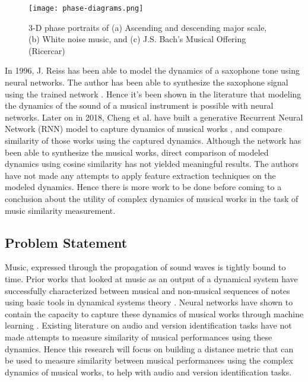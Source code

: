 \documentclass[../main.tex]{subfiles}
\begin{document}
\begin{figure}[h]
    \centering
    \texttt{[image: phase-diagrams.png]}
    \caption{3-D phase portraits of (a) Ascending and descending major scale, (b) White noise music, and (c) J.S. Bach's Musical Offering (Ricercar)}
    \label{fig:phase-diagrams}
\end{figure}

\par
In 1996, J. Reiss has been able to model the dynamics of a saxophone tone using neural networks. The author has been able to synthesize the saxophone signal using the trained network \cite{robelNeuralNetworkModeling1997}. Hence it's been shown in the literature that modeling the dynamics of the sound of a musical instrument is possible with neural networks. Later on in 2018, Cheng et al. have built a generative Recurrent Neural Network (\gls{RNN}) model to capture dynamics of musical works  \cite{tian_cheng_comparing_2018}, and compare similarity of those works using the captured dynamics. Although the network has been able to synthesize the musical works, direct comparison of modeled dynamics using cosine similarity has not yielded meaningful results. The authors have not made any attempts to apply feature extraction techniques on the modeled dynamics. Hence there is more work to be done before coming to a conclusion about the utility of complex dynamics of musical works in the task of music similarity measurement.


\subsection{Problem Statement}

\par
Music, expressed through the propagation of sound waves is tightly bound to time. Prior works that looked at music as an output of a dynamical system have successfully characterized between musical and non-musical sequences of notes using basic tools in dynamical systems theory \cite{complex_dynamics}. Neural networks have shown to contain the capacity to capture these dynamics of musical works through machine learning \cite{robelNeuralNetworkModeling1997,dynamic_process_modeling_with_rnn}. Existing literature on audio and version identification tasks have not made attempts to measure similarity of musical performances using these dynamics. Hence this research will focus on building a distance metric that can be used to measure similarity between musical performances using the complex dynamics of musical works, to help with audio and version identification tasks.
\end{document}
